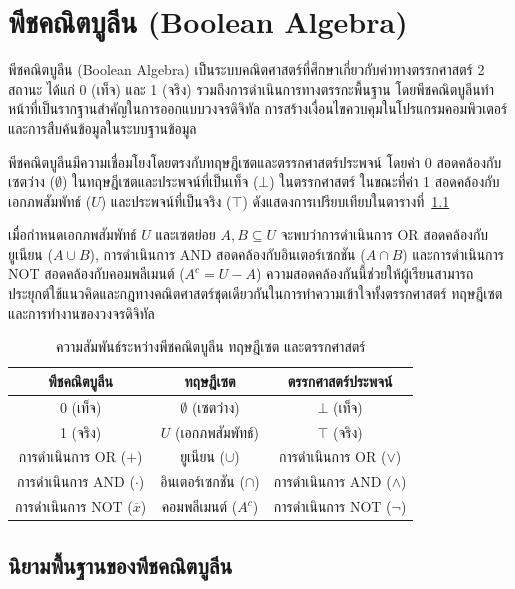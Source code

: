 \chapter{พีชคณิตบูลีน (Boolean Algebra)}
\label{ch:boolean}

พีชคณิตบูลีน (Boolean Algebra) เป็นระบบคณิตศาสตร์ที่ศึกษาเกี่ยวกับค่าทางตรรกศาสตร์ 2 สถานะ ได้แก่ 0 (เท็จ) และ 1 (จริง) รวมถึงการดำเนินการทางตรรกะพื้นฐาน โดยพีชคณิตบูลีนทำหน้าที่เป็นรากฐานสำคัญในการออกแบบวงจรดิจิทัล การสร้างเงื่อนไขควบคุมในโปรแกรมคอมพิวเตอร์ และการสืบค้นข้อมูลในระบบฐานข้อมูล~\parencite{mano2018digital}

พีชคณิตบูลีนมีความเชื่อมโยงโดยตรงกับทฤษฎีเซตและตรรกศาสตร์ประพจน์ โดยค่า 0 สอดคล้องกับเซตว่าง ($\emptyset$) ในทฤษฎีเซตและประพจน์ที่เป็นเท็จ ($\bot$) ในตรรกศาสตร์ ในขณะที่ค่า 1 สอดคล้องกับเอกภพสัมพัทธ์ ($U$) และประพจน์ที่เป็นจริง ($\top$) ดังแสดงการเปรียบเทียบในตารางที่~\ref{tab:boolean-set-logic}

เมื่อกำหนดเอกภพสัมพัทธ์ $U$ และเซตย่อย $A, B \subseteq U$ จะพบว่าการดำเนินการ OR สอดคล้องกับยูเนียน ($A \cup B$), การดำเนินการ AND สอดคล้องกับอินเตอร์เซกชัน ($A \cap B$) และการดำเนินการ NOT สอดคล้องกับคอมพลีเมนต์ ($A^c = U - A$) ความสอดคล้องกันนี้ช่วยให้ผู้เรียนสามารถประยุกต์ใช้แนวคิดและกฎทางคณิตศาสตร์ชุดเดียวกันในการทำความเข้าใจทั้งตรรกศาสตร์ ทฤษฎีเซต และการทำงานของวงจรดิจิทัล

\begin{table}[!htb]
    \centering
    \caption{ความสัมพันธ์ระหว่างพีชคณิตบูลีน ทฤษฎีเซต และตรรกศาสตร์}
    \label{tab:boolean-set-logic}
    \begin{tabular}{|c|c|c|}
        \hline
        พีชคณิตบูลีน & ทฤษฎีเซต & ตรรกศาสตร์ประพจน์ \\
        \hline
        0 (เท็จ) & $\emptyset$ (เซตว่าง) & $\bot$ (เท็จ) \\
        \hline
        1 (จริง) & $U$ (เอกภพสัมพัทธ์) & $\top$ (จริง) \\
        \hline
        การดำเนินการ OR ($+$) & ยูเนียน ($\cup$) & การดำเนินการ OR ($\lor$) \\
        \hline
        การดำเนินการ AND ($\cdot$) & อินเตอร์เซกชัน ($\cap$) & การดำเนินการ AND ($\land$) \\
        \hline
        การดำเนินการ NOT ($\overline{x}$) & คอมพลีเมนต์ ($A^c$) & การดำเนินการ NOT ($\neg$) \\
        \hline
    \end{tabular}
\end{table}

\section{นิยามพื้นฐานของพีชคณิตบูลีน}
\label{sec:boolean-definitions}


